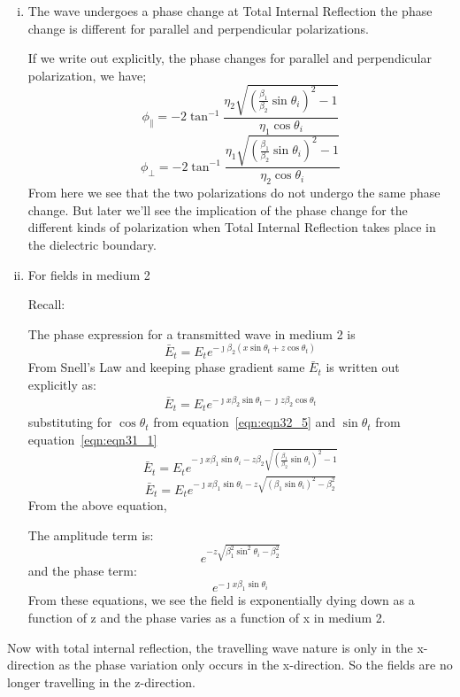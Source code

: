 \begin{enumerate}[(i)]
\item The wave undergoes a phase change at Total Internal Reflection the phase change is different for parallel and perpendicular polarizations.

If we write out explicitly, the phase changes for parallel and perpendicular polarization, we have;
\begin{equation}
\phi_\parallel = -2\tan^{-1}\frac{\eta_2\sqrt{(\frac{\beta_1}{\beta_2}\sin\theta_i)^2-1}}{\eta_1\cos\theta_i}
\end{equation}
\begin{equation}
\phi_\perp = -2\tan^{-1}\frac{\eta_1\sqrt{(\frac{\beta_1}{\beta_2}\sin\theta_i)^2-1}}{\eta_2\cos\theta_i}
\end{equation}
From here we see that the two polarizations do not undergo the same phase change. But later we'll see the implication of the phase change for the different kinds of polarization when Total Internal Reflection takes place in the dielectric boundary. 

\item For fields in medium 2

Recall:

The phase expression for a transmitted wave in medium 2 is
\begin{equation*}
\bar{E}_t = E_{t}e^{-\jmath \beta_2(x\sin\theta_t + z\cos\theta_t)}
\end{equation*}
From Snell's Law and keeping phase gradient same $\bar{E}_t$ is written out explicitly as:
\begin{align}
\bar{E}_t = E_te^{- \jmath x\beta_2\sin\theta_t - \jmath z\beta_2\cos\theta_t}
\end{align}
substituting for $\cos\theta_t$ from equation~\ref{eqn:eqn32_5}
and $\sin\theta_t$ from equation~\ref{eqn:eqn31_1}
\begin{equation*}
\bar{E}_t = E_te^{- {\jmath x\beta_1\sin\theta_i}  -  z \beta_2\sqrt{{(\frac{\beta_1}{\beta_2}\sin\theta_i)}^2 - 1}}
\end{equation*}
\begin{equation}
\bar{E}_t = E_te^{- {\jmath x\beta_1\sin\theta_i}  -  z \sqrt{{(\beta_1\sin\theta_i)}^2 - \beta_{2}^{2}}}
\end{equation}
From the above equation,

The amplitude term is:
\begin{equation}
e^{-z\sqrt{\beta_1^2\sin^2\theta_i - \beta_2^{2}}}
\label{eqn:amplitude_term_total_internal_reflection}
\end{equation}
and the phase term:
\begin{equation}
e^{- \jmath x\beta_1\sin\theta_i}
\label{eqn:phase_term_total_internal_reflection}
\end{equation}
From these equations, we see the field is exponentially dying down as a function of z and the phase varies as a function of x in medium 2.
\end{enumerate}
Now with total internal reflection, the travelling wave nature is only in the x-direction as the phase variation only occurs in the x-direction. So the fields are no longer travelling in the z-direction.

